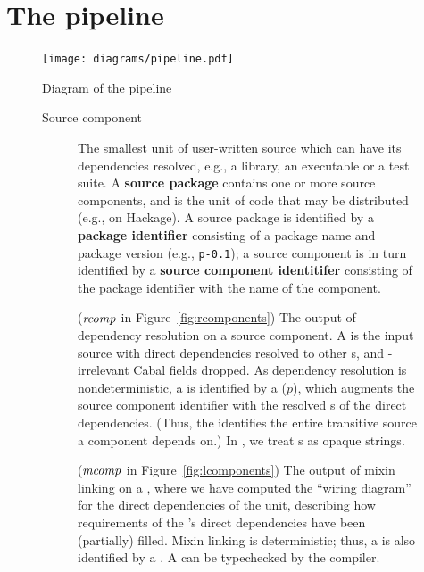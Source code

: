 \chapter{The pipeline}
\label{sec:overview}

\begin{figure}
\center\texttt{[image: diagrams/pipeline.pdf]}
\caption{Diagram of the pipeline}\label{fig:pipeline}
\end{figure}

\begin{figure}
\begin{mdframed}
\begin{description}
    \item[Source component]
        The smallest unit of user-written source which can have its
        dependencies resolved, e.g., a library, an executable or a test
        suite.  A \textbf{source package} contains one or more source
        components, and is the unit of code that may be distributed
        (e.g., on Hackage).  A source package is identified by a
        \textbf{package identifier} consisting of a package name and
        package version (e.g., \verb|p-0.1|); a source component is in
        turn identified by a \textbf{source component identitifer}
        consisting of the package identifier with the name of the
        component.
    \item[\Ccomp{}] ($\mathit{rcomp}$ in Figure~\ref{fig:rcomponents}) The output of dependency
        resolution on a source component.  A \ccomp{} is the
        input source with direct dependencies resolved to
        other \ccomp{}s, and \Backpack{}-irrelevant Cabal fields dropped.
        As dependency resolution is
        nondeterministic, a \ccomp{} is identified by a \textbf{\cid}
        ($p$), which augments the source component identifier with the
        resolved \cid{}s of the direct dependencies.  (Thus, the \cid{}
        identifies the entire transitive source a component depends on.)
        In \Backpack{}, we treat \cid{}s as opaque strings.
    \item[\Unit{}] ($\mathit{mcomp}$ in Figure~\ref{fig:lcomponents}) The output
        of mixin linking on a \ccomp{}, where we have computed the ``wiring
        diagram'' for the direct dependencies of the unit, describing how
        requirements of the \ccomp{}'s direct dependencies have been
        (partially) filled.  Mixin linking is
        deterministic; thus, a \unit{} is also identified by a \cid{}.  A
        \unit{} can be typechecked by the compiler.

\end{description}
\end{mdframed}
\end{figure}
